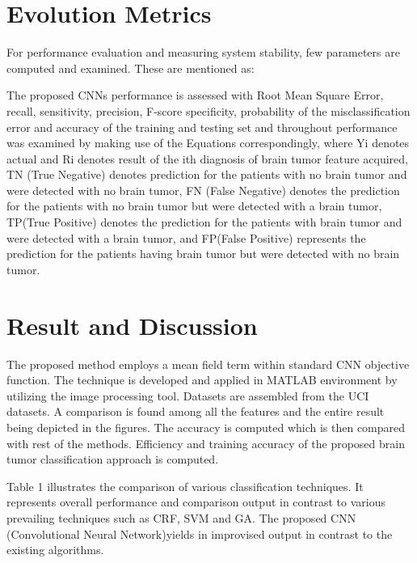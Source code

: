\documentclass[a4paper, 12pt]{report}
\begin{document}
\begin{spacing}{1.5}
\section{Evolution Metrics}

\par For performance evaluation and measuring system stability, few parameters are computed and examined. These are mentioned as:
\par The proposed CNNs performance is assessed with Root Mean Square Error, recall, sensitivity, precision, F-score specificity, probability of the misclassification error and accuracy of the training and testing set and throughout performance was examined by
making use of the Equations correspondingly, where Yi denotes actual and Ri denotes result of the ith diagnosis of brain tumor feature acquired, TN (True Negative) denotes
prediction for the patients with no brain tumor and were detected with no brain tumor, FN (False Negative) denotes the prediction for the patients with no brain tumor but
were detected with a brain tumor, TP(True Positive) denotes the prediction for the patients with brain tumor and were detected with a brain tumor, and FP(False Positive) represents the prediction for the patients having brain tumor but were detected with no brain tumor.

\section{Result and Discussion}
\par The proposed method employs a mean field term within standard CNN objective function. The technique is developed and applied in MATLAB environment by utilizing the image processing tool. Datasets are assembled from the UCI datasets. A comparison is found among all the features and the entire result being depicted in the figures. The accuracy is computed which is then compared with rest of the methods. Efficiency and training accuracy of the proposed brain tumor classification approach is computed.\\

\par Table 1 illustrates the comparison of various classification techniques. It represents overall performance and comparison output in contrast to various prevailing techniques such as CRF, SVM and GA. The proposed CNN (Convolutional Neural Network)yields in improvised output in contrast to the
existing algorithms.


\end{spacing}
\end{document}
